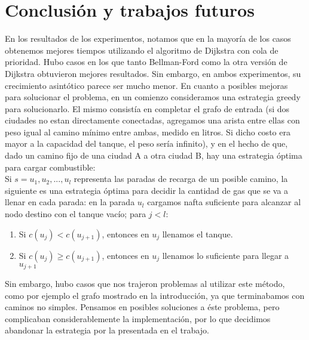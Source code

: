 \section{Conclusión y trabajos futuros}

En los resultados de los experimentos, notamos que en la mayoría de los casos obtenemos mejores tiempos utilizando el algoritmo de Dijkstra con cola de prioridad. Hubo casos en los que tanto Bellman-Ford como la otra versión de Dijkstra obtuvieron mejores resultados. Sin embargo, en ambos experimentos, su crecimiento asintótico parece ser mucho menor.
En cuanto a posibles mejoras para solucionar el problema, en un comienzo consideramos una estrategia greedy para solucionarlo. El mismo consistía en completar el grafo de entrada (si dos ciudades no estan directamente conectadas, agregamos una arista entre ellas con peso igual al camino mínimo entre ambas, medido en litros. Si dicho costo era mayor a la capacidad del tanque, el peso sería infinito), y en el hecho de que, dado un camino fijo de una ciudad A a otra ciudad B, hay una estrategia óptima para cargar combustible: \\
\indent Si $s = u_{1}, u_{2}, ... , u_{l}$ representa las paradas de recarga de un posible camino, la siguiente es una estrategia óptima para decidir la cantidad de gas que se va a llenar en cada parada:
en la parada $u_{l}$ cargamos nafta suficiente para alcanzar al nodo destino con el tanque vacío; para $j <l$:
\begin{enumerate}
 	\item Si $c(u_{j}) < c(u_{j+1})$, entonces en $u_{j}$ llenamos el tanque.
 	\item Si $c(u_{j}) \geq c(u_{j+1})$, entonces en $u_{j}$ llenamos lo suficiente para llegar a $u_{j+1}$
\end{enumerate}

Sin embargo, hubo casos que nos trajeron problemas al utilizar este método, como por ejemplo el grafo mostrado en la introducción, ya que terminabamos con caminos no simples. Pensamos en posibles soluciones a éste problema, pero complicaban considerablemente la implementación, por lo que decidimos abandonar la estrategia por la presentada en el trabajo.
